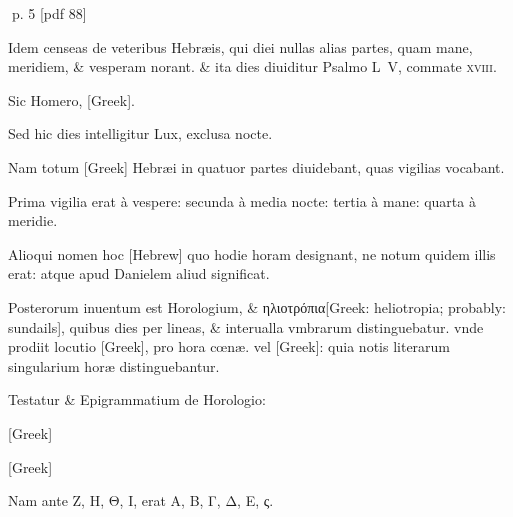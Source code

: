 \clearpage
p. 5 [pdf 88]

\begin{parnumbers}

Idem censeas de veteribus Hebræis,  qui diei nullas alias partes, quam mane, meridiem, \& vesperam norant. \& ita dies diuiditur Psalmo L V, commate \textsc{xviii}.

Sic Homero, \textgreek{[Greek]}.

Sed hic dies intelligitur Lux, exclusa nocte.

Nam totum \textgreek{[Greek]} Hebræi in quatuor partes diuidebant, quas vigilias vocabant.

Prima vigilia erat à vespere: secunda à media nocte: tertia à mane: quarta à meridie.

Alioqui nomen hoc \texthebrew{[Hebrew]} quo hodie horam designant, ne notum quidem illis erat: atque apud Danielem aliud significat.

Posterorum inuentum est Horologium, \& \textgreek{ηλιοτρόπια[Greek: heliotropia; probably: sundails]}, quibus dies per lineas, \& interualla vmbrarum distinguebatur. vnde prodiit locutio \textgreek{[Greek]}, pro hora cœnæ. vel \textgreek{[Greek]}:  quia notis literarum singularium horæ distinguebantur.

Testatur \& Epigrammatium de Horologio:

\textgreek{[Greek]}

\textgreek{[Greek]}

Nam ante \textgreek{Ζ, Η, Θ, Ι,} erat \textgreek{Α, Β, Γ, Δ, Ε, ς.}


\end{parnumbers}
